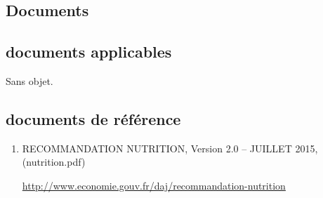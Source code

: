 \textcolor[RGB]{46, 116, 181}{\chapter{Documents}}
\section{documents applicables}
Sans objet.
\section{documents de référence}
\begin{enumerate}
\item\label{docNutrition} RECOMMANDATION NUTRITION, Version 2.0 – JUILLET 2015, (nutrition.pdf)

\url{http://www.economie.gouv.fr/daj/recommandation-nutrition}
\end{enumerate}
